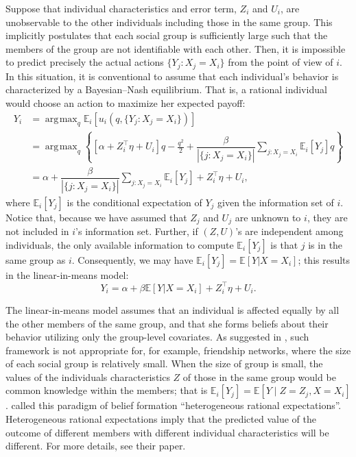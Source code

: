 \documentclass[10.5pt, A4paper, openany, uplatex]{book}
\newcommand{\E}{\mathbb{E}}
\numberwithin{equation}{section}
\DeclareMathOperator*{\argmax}{\arg\!\max}
\begin{document}
Suppose that individual characteristics and error term, $Z_i$ and $U_i$, are unobservable to the other individuals including those in the same group. 
This implicitly postulates that each social group is sufficiently large such that the members of the group are not identifiable with each other.
Then, it is impossible to predict precisely the actual actions $\{Y_j: X_j = X_i \}$ from the point of view of $i$. In this situation, it is conventional to assume that each individual's behavior is characterized by a Bayesian--Nash equilibrium.
That is, a rational individual would choose an action to maximize her expected payoff:
\begin{align*}
	Y_i 
	&=\argmax_q \E_i \left[ u_i(q, \{Y_j : X_j = X_i \}) \right] \\
	&=\argmax_q \left\{ \left[ \alpha + Z_i^\top \eta  + U_i \right] q -\frac{q^{2}}{2} + \dfrac{\beta}{|\{j : X_j = X_i \}|}\sum_{j : X_j = X_i}  \E_i[Y_j] q \right\} \\
	&= \alpha + \dfrac{\beta}{|\{j : X_j = X_i \}|}\sum_{j : X_j = X_i}  \E_i[Y_j] + Z_i^\top \eta  + U_i,
\end{align*}
where $\E_i[Y_j]$ is the conditional expectation of $Y_j$ given the information set of $i$.
Notice that, because we have assumed that $Z_j$ and $U_j$ are unknown to $i$, they are not included in $i$'s information set.
Further, if $(Z, U)$'s are independent among individuals, the only available information to compute $\E_i[Y_j]$ is that $j$ is in the same group as $i$.
Consequently, we may have $\E_i[Y_j] = \E[Y | X = X_i]$; this results in the linear-in-means model:
\[
	Y_i = \alpha + \beta \E[Y | X = X_i] + Z_i^\top \eta  + U_i.
\]

The linear-in-means model assumes that an individual is affected equally by all the other members of the same group, and that she forms beliefs about their behavior utilizing only the group-level covariates.
As suggested in \cite{lee2014binary}, such framework is not appropriate for, for example, friendship networks, where the size of each social group is relatively small.
When the size of group is small, the values of the individuals characteristics $Z$ of those in the same group would be common knowledge within the members; that is $\E_i[Y_j] = \E[Y \mid Z = Z_j, X = X_i]$.
\cite{lee2014binary} called this paradigm of belief formation ``heterogeneous rational expectations''.
Heterogeneous rational expectations imply that the predicted value of the outcome of different members with different individual characteristics will be different. 
For more details, see their paper.
\end{document}
